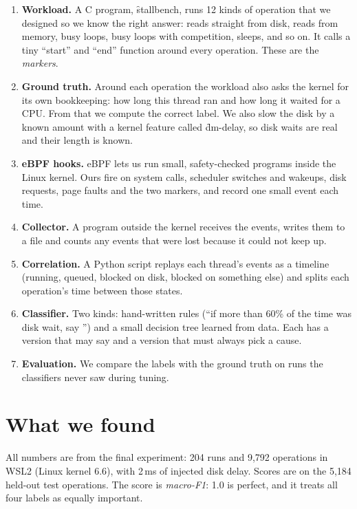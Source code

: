 \documentclass[11pt]{article}
\begin{document}
\begin{enumerate}
\item \textbf{Workload.} A C program, \f{stallbench}, runs 12 kinds of operation that we designed so we know the right answer: reads straight from disk, reads from memory, busy loops, busy loops with competition, sleeps, and so on. It calls a tiny ``start'' and ``end'' function around every operation. These are the \emph{markers}.
\item \textbf{Ground truth.} Around each operation the workload also asks the kernel for its own bookkeeping: how long this thread ran and how long it waited for a CPU. From that we compute the correct label. We also slow the disk by a known amount with a kernel feature called \f{dm-delay}, so disk waits are real and their length is known.
\item \textbf{eBPF hooks.} eBPF lets us run small, safety-checked programs inside the Linux kernel. Ours fire on system calls, scheduler switches and wakeups, disk requests, page faults and the two markers, and record one small event each time.
\item \textbf{Collector.} A program outside the kernel receives the events, writes them to a file and counts any events that were lost because it could not keep up.
\item \textbf{Correlation.} A Python script replays each thread's events as a timeline (running, queued, blocked on disk, blocked on something else) and splits each operation's time between those states.
\item \textbf{Classifier.} Two kinds: hand-written rules (``if more than 60\% of the time was disk wait, say \IOW'') and a small decision tree learned from data. Each has a version that may say \IND{} and a version that must always pick a cause.
\item \textbf{Evaluation.} We compare the labels with the ground truth on runs the classifiers never saw during tuning.
\end{enumerate}

\section{What we found}

All numbers are from the final experiment: 204 runs and 9{,}792 operations in WSL2 (Linux kernel 6.6), with 2\,ms of injected disk delay. Scores are on the 5{,}184 held-out test operations. The score is \emph{macro-F1}: 1.0 is perfect, and it treats all four labels as equally important.
\end{document}
